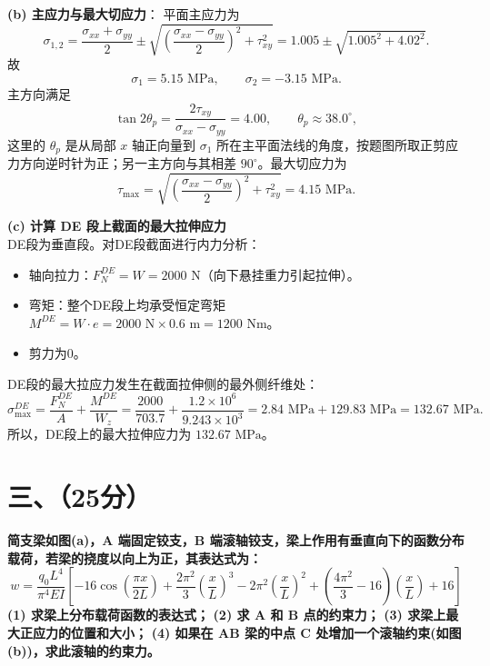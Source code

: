 \documentclass[11pt,a4paper]{ctexrep}
\begin{document}
{\textbf{(b) 主应力与最大切应力}：
平面主应力为
\[
    \sigma_{1,2}
    =\frac{\sigma_{xx}+\sigma_{yy}}{2}
    \pm
    \sqrt{\left(\frac{\sigma_{xx}-\sigma_{yy}}{2}\right)^2+\tau_{xy}^2}
    =1.005\pm\sqrt{1.005^2+4.02^2}.
\]
故
\[
    \sigma_1=5.15\text{ MPa},\qquad
    \sigma_2=-3.15\text{ MPa}.
\]
主方向满足
\[
    \tan 2\theta_p=\frac{2\tau_{xy}}{\sigma_{xx}-\sigma_{yy}}
    =4.00,\qquad
    \theta_p\approx 38.0^\circ ,
\]
这里的 $\theta_p$ 是从局部 $x$ 轴正向量到 $\sigma_1$ 所在主平面法线的角度，按题图所取正剪应力方向逆时针为正；另一主方向与其相差 $90^\circ$。最大切应力为
\[
    \tau_{\max}
    =
    \sqrt{\left(\frac{\sigma_{xx}-\sigma_{yy}}{2}\right)^2+\tau_{xy}^2}
    =4.15\text{ MPa}.
\]

\textbf{(c) 计算 DE 段上截面的最大拉伸应力} \\
DE段为垂直段。对DE段截面进行内力分析：
\begin{itemize}
    \item 轴向拉力：$F_N^{DE} = W = 2000\text{ N}$（向下悬挂重力引起拉伸）。
    \item 弯矩：整个DE段上均承受恒定弯矩 $M^{DE} = W \cdot e = 2000\text{ N} \times 0.6\text{ m} = 1200\text{ Nm}$。
    \item 剪力为0。
\end{itemize}
DE段的最大拉应力发生在截面拉伸侧的最外侧纤维处：
\[
    \sigma_{\max}^{DE}
    =
    \frac{F_N^{DE}}{A}+\frac{M^{DE}}{W_z}
    =
    \frac{2000}{703.7}
    +
    \frac{1.2\times10^6}{9.243\times10^3}
    =
    2.84\text{ MPa}+129.83\text{ MPa}
    =
    132.67\text{ MPa}.
\]
所以，DE段上的最大拉伸应力为 \textbf{$132.67\text{ MPa}$}。




\section*{三、（25分）}

\textbf{简支梁如图(a)，A 端固定铰支，B 端滚轴铰支，梁上作用有垂直向下的函数分布载荷，若梁的挠度以向上为正，其表达式为：}
\[
    w = \frac{q_0 L^4}{\pi^4 EI} \left[ -16 \cos\left(\frac{\pi x}{2L}\right) + \frac{2\pi^2}{3}\left(\frac{x}{L}\right)^3 - 2\pi^2\left(\frac{x}{L}\right)^2 + \left(\frac{4\pi^2}{3} - 16\right)\left(\frac{x}{L}\right) + 16 \right]
\]
\textbf{(1) 求梁上分布载荷函数的表达式；}
\textbf{(2) 求 A 和 B 点的约束力；}
\textbf{(3) 求梁上最大正应力的位置和大小；}
\textbf{(4) 如果在 AB 梁的中点 C 处增加一个滚轴约束(如图 (b))，求此滚轴的约束力。}

\begin{center}
\end{center}}
\end{document}
